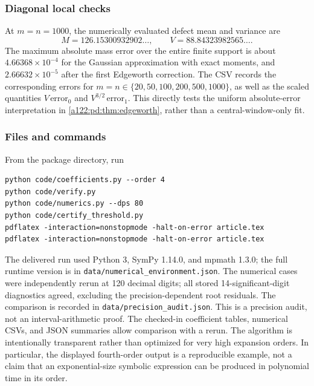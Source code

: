 \documentclass[11pt,letterpaper]{article}
\numberwithin{equation}{subsection}
\theoremstyle{definition}
\theoremstyle{remark}
\theoremstyle{plain}
\begin{document}
\subsubsection{Diagonal local checks}
At $m=n=1000$, the numerically evaluated defect mean and variance are
\[
 M=126.15300932902\ldots,\qquad V=88.84323982565\ldots.
\]
The maximum absolute mass error over the entire finite support is about
$4.66368\times10^{-4}$ for the Gaussian approximation with exact
moments, and $2.66632\times10^{-5}$ after the first Edgeworth correction.
The CSV records the corresponding errors for
$m=n\in\{20,50,100,200,500,1000\}$, as well as the scaled quantities
$V\,\text{error}_0$ and $V^{3/2}\,\text{error}_1$.
This directly tests the uniform absolute-error interpretation in
\cref{a122:pd:thm:edgeworth}, rather than a central-window-only fit.

\subsubsection{Files and commands}
From the package directory, run
\begin{verbatim}
python code/coefficients.py --order 4
python code/verify.py
python code/numerics.py --dps 80
python code/certify_threshold.py
pdflatex -interaction=nonstopmode -halt-on-error article.tex
pdflatex -interaction=nonstopmode -halt-on-error article.tex
\end{verbatim}
The delivered run used Python 3, SymPy 1.14.0, and mpmath 1.3.0; the full
runtime version is in \texttt{data/numerical\_environment.json}.
The numerical cases were independently rerun at 120 decimal digits;
all stored 14-significant-digit diagnostics agreed, excluding the
precision-dependent root residuals. The comparison is recorded in
\texttt{data/precision\_audit.json}. This is a precision audit, not
an interval-arithmetic proof.
The checked-in coefficient tables, numerical CSVs, and JSON summaries
allow comparison with a rerun. The algorithm is intentionally transparent
rather than optimized for very high expansion orders. In particular,
the displayed fourth-order output is a reproducible example, not a
claim that an exponential-size symbolic expression can be produced in
polynomial time in its order.
\end{document}
